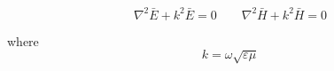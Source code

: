 \begin{yellowbox}
\begin{equation*}
\nabla^2 \bar{E} + k^2 \bar{E} = 0 \quad \quad \nabla^2 \bar{H} + k^2 \bar{H} = 0
\end{equation*}
\end{yellowbox}

where
\begin{equation*}
k = \omega \sqrt{\varepsilon \mu}
\end{equation*}